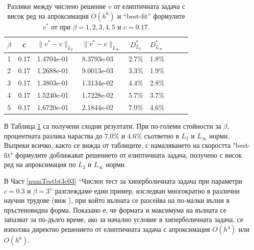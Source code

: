 \documentclass[a4paper]{article}
\theoremstyle{remark}
\begin{document}
\begin{large}
\begin{table}[ht]
\centering
\begin{tabular}{|l|c|l l| c|l|c|l l|}
\hline 
\hline 
$\beta$	& c 	& $\|v^*-v \|_{L_2 }$ & $\|v^*-v \|_{L_\infty }$  	& $D^*_{L_2}$	& $D^*_{L_\infty }$	\\
\hline 
1& 		0.17&	1.4704e-01 		& 	8.3793e-03 				& 2.7\%			& 1.8\%		\\
\hline 
2& 		0.17&	1.2688e-01 		& 	9.0013e-03				& 3.3\%			& 1.9\%		\\
\hline 
3& 		0.17&	1.3803e-01 		& 	1.3134e-02				& 4.4\%			& 2.8\%		\\
\hline 
4& 		0.17&	 1.5240e-01 		& 	1.7228e-02				& 5.7\%			& 3.7\%		\\
\hline 
5& 		0.17&	1.6720e-01 		& 	2.1844e-02				& 7.0\%			& 4.6\%		\\
\hline 
\hline 
\end{tabular}
\caption{Разлики между числено решение $v$ от елиптичната задача с висок ред на апроксимация $O(h^6)$ и ``best-fit'' формулите $v^*$ от \cite{ref15} при $\beta=1, 2, 3, 4, 5$ и $c=0.17$.}
\label{tab:diff-c017}
\end{table}
В Таблица \ref{tab:diff-c017} са получени сходни резултати. При по-големи стойности за $\beta$, процентната разлика нараства до $7.0\%$ и $4.6\%$ съответно в $L_2$ и $L_\infty$ норми. Въпреки всичко, както се вижда от таблиците, с намаляването на скоростта "best-fit" формулите доближават решението от елиптичната задача, получено с висок ред на апроксимация по $L_2$ и $L_\infty$ норми.

В Част \ref{numTestbt3c03} ``Числен тест за хиперболичната задача при параметри $c=0.3$ и $\beta = 3$'' разглеждаме един пример, изследван многократно в  различни научни трудове (виж \cite{ref21, ref20, ref23, ref22}), при който вълната се разсейва на по-малки вълни в пръстеновидна форма. Показано е, че формата и максимума на вълната се запазват за по-дълго време, ако за начално условие в хиперболичната задача, се използва директно решението от елиптичната задача с апроксимация $O(h^4)$ или $O(h^6)$. 


\end{large}
\end{document}
